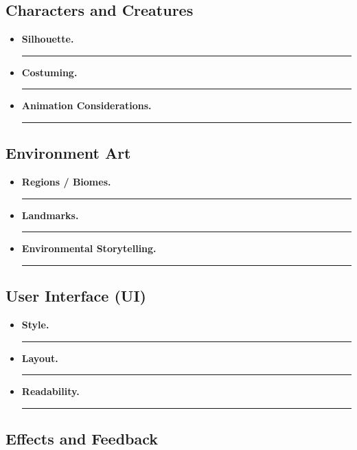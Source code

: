 \documentclass[12pt]{article}
\newcommand{\placeholder}[1]{\rule[-0.4em]{0pt}{2em}\rule{0.62\linewidth}{0.4pt}}
\begin{document}
\subsection{Characters and Creatures}

\begin{itemize}
    \item \textbf{Silhouette.} \placeholder{Distinctive shapes that make characters readable at a glance.}
    \item \textbf{Costuming.} \placeholder{Clothing, armor, accessories, and how they reflect role and personality.}
    \item \textbf{Animation Considerations.} \placeholder{How design supports movement, combat, and expression.}
\end{itemize}

\subsection{Environment Art}

\begin{itemize}
    \item \textbf{Regions / Biomes.} \placeholder{List key regions (forest, city, desert, etc.) and their visual identity.}
    \item \textbf{Landmarks.} \placeholder{Important structures or locations that help orientation and storytelling.}
    \item \textbf{Environmental Storytelling.} \placeholder{How the world hints at history, conflict, or ongoing events.}
\end{itemize}

\subsection{User Interface (UI)}

\begin{itemize}
    \item \textbf{Style.} \placeholder{Minimalist, skeuomorphic, retro, high-tech, etc.}
    \item \textbf{Layout.} \placeholder{Key screens: main menu, HUD, inventory, settings, etc.}
    \item \textbf{Readability.} \placeholder{Legibility at different resolutions, colorblind-safe choices, contrast, etc.}
\end{itemize}

\subsection{Effects and Feedback}
\end{document}
